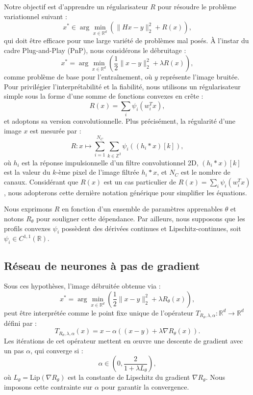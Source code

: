 \documentclass[a4paper, 12pt]{report} %
\begin{document}
Notre objectif est d'apprendre un régularisateur \( R \) pour résoudre le problème variationnel suivant :  
\[
x^* \in \arg \min_{x \in \mathbb{R}^d} \left( \| Hx - y \|_2^2 + R(x) \right),
\]
qui doit être efficace pour une large variété de problèmes mal posés. À l'instar du cadre Plug-and-Play (PnP), nous considérons le débruitage :  
\[
x^* = \arg \min_{x \in \mathbb{R}^d} \left( \frac{1}{2} \| x - y \|_2^2 + \lambda R(x) \right),
\]
comme problème de base pour l'entraînement, où \( y \) représente l'image bruitée. Pour privilégier l'interprétabilité et la fiabilité, nous utilisons un régularisateur simple sous la forme d’une somme de fonctions convexes en crête :  
\[
R(x) = \sum_{i} \psi_i(w_i^T x),
\]
et adoptons sa version convolutionnelle. Plus précisément, la régularité d'une image \( x \) est mesurée par :  
\[
R: x \mapsto \sum_{i=1}^{N_C} \sum_{k \in \mathbb{Z}^2} \psi_i \left( (h_i * x)[k] \right),
\]
où \( h_i \) est la réponse impulsionnelle d'un filtre convolutionnel 2D, \( (h_i * x)[k] \) est la valeur du \( k \)-ème pixel de l'image filtrée \( h_i * x \), et \( N_C \) est le nombre de canaux. Considérant que \( R(x) \) est un cas particulier de \( R(x) = \sum_{i} \psi_i(w_i^T x) \), nous adopterons cette dernière notation générique pour simplifier les équations.

Nous exprimons \( R \) en fonction d’un ensemble de paramètres apprenables \( \theta \) et notons \( R_\theta \) pour souligner cette dépendance. Par ailleurs, nous supposons que les profils convexes \( \psi_i \) possèdent des dérivées continues et Lipschitz-continues, soit \( \psi_i \in C^{1,1}(\mathbb{R}) \).

\subsection{Réseau de neurones à pas de gradient}

Sous ces hypothèses, l’image débruitée obtenue via :  
\[
x^* = \arg \min_{x \in \mathbb{R}^d} \left( \frac{1}{2} \| x - y \|_2^2 + \lambda R_\theta(x) \right),
\]
peut être interprétée comme le point fixe unique de l’opérateur \( T_{R_\theta,\lambda,\alpha} : \mathbb{R}^d \to \mathbb{R}^d \) défini par :  
\[
T_{R_\theta,\lambda,\alpha}(x) = x - \alpha \left( (x - y) + \lambda \nabla R_\theta(x) \right).
\]
Les itérations de cet opérateur mettent en œuvre une descente de gradient avec un pas \( \alpha \), qui converge si :  
\[
\alpha \in \left(0, \frac{2}{1 + \lambda L_\theta}\right),
\]
où \( L_\theta = \text{Lip}(\nabla R_\theta) \) est la constante de Lipschitz du gradient \( \nabla R_\theta \). Nous imposons cette contrainte sur \( \alpha \) pour garantir la convergence.
\end{document}
